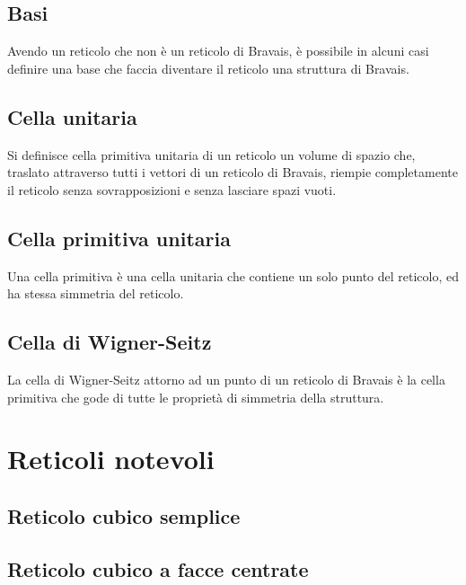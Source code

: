 \documentclass[10pt,a4paper]{report}
\begin{document}
		\subsection{Basi}
			Avendo un reticolo che non è un reticolo di Bravais, è possibile in alcuni casi definire una base che faccia diventare il reticolo una struttura di Bravais.
		
		\subsection{Cella unitaria}

			Si definisce cella primitiva unitaria di un reticolo un volume di spazio che, traslato attraverso tutti i vettori di un reticolo di Bravais, riempie completamente il reticolo senza sovrapposizioni e senza lasciare spazi vuoti.

		\subsection{Cella primitiva unitaria}
			Una cella primitiva è una cella unitaria che contiene un solo punto del reticolo, ed ha stessa simmetria del reticolo.
		
		\subsection{Cella di Wigner-Seitz}
				La cella di Wigner-Seitz attorno ad un punto di un reticolo di Bravais è la cella primitiva che gode di tutte le proprietà di simmetria della struttura.
			
			
			
	
	\section{Reticoli notevoli}
		
		\subsection{Reticolo cubico semplice}
			

		\subsection{Reticolo cubico a facce centrate}
	
	
\end{document}
